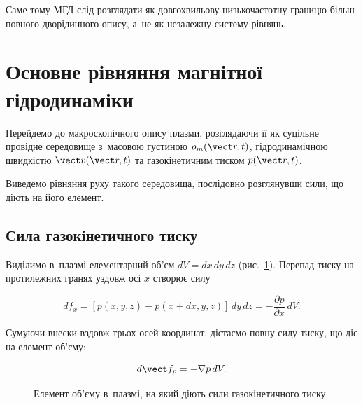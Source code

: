 Саме тому МГД слід розглядати як довгохвильову низькочастотну границю більш повного
дворідинного опису, а~не як незалежну систему рівнянь.



\section{Основне рівняння магнітної гідродинаміки}



Перейдемо до макроскопічного опису плазми, розглядаючи її як суцільне провідне середовище
з~масовою густиною $\rho_m(\vect r,t)$, гідродинамічною швидкістю $\vect v(\vect r,t)$ та
газокінетичним тиском $p(\vect r,t)$.

Виведемо рівняння руху такого середовища, послідовно розглянувши сили, що діють на його
елемент.



\subsection{Сила газокінетичного тиску}



Виділимо в~плазмі елементарний об'єм $dV=dx\,dy\,dz$ (рис.~\ref{pic:volume-element}).
Перепад тиску на протилежних гранях уздовж осі $x$ створює силу

\begin{equation*}
    df_x
    =
    [p(x,y,z)-p(x+dx,y,z)]\,dy\,dz
    =
    -\frac{\partial p}{\partial x}\,dV.
\end{equation*}

Сумуючи внески вздовж трьох осей координат, дістаємо повну силу тиску, що діє на елемент
об'єму:

\begin{equation*}
    d\vect f_p=-\nabla p\,dV.
\end{equation*}

\begin{figure}[h!]
    \centering
    \caption{Елемент об'єму в~плазмі, на який діють сили газокінетичного тиску}
    \label{pic:volume-element}
\end{figure}



